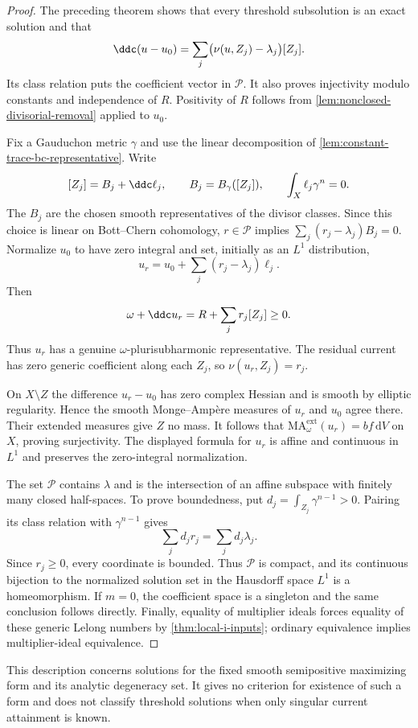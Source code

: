 \begin{proof}
The preceding theorem shows that every threshold subsolution is an exact solution and that
\[
 \ddc(u-u_0)=\sum_j\bigl(\nu(u,Z_j)-\lambda_j\bigr)[Z_j].
\]
Its class relation puts the coefficient vector in $\mathcal P$. It also proves injectivity modulo constants and independence of $R$. Positivity of $R$ follows from \cref{lem:nonclosed-divisorial-removal} applied to $u_0$.

Fix a Gauduchon metric $\gamma$ and use the linear decomposition of \cref{lem:constant-trace-bc-representative}. Write
\[
 [Z_j]=B_j+\ddc\ell_j,\qquad
 B_j=B_\gamma([Z_j]),\qquad \int_X\ell_j\gamma^n=0.
\]
The $B_j$ are the chosen smooth representatives of the divisor classes. Since this choice is linear on Bott--Chern cohomology, $r\in\mathcal P$ implies $\sum_j(r_j-\lambda_j)B_j=0$. Normalize $u_0$ to have zero integral and set, initially as an $L^1$ distribution,
\[
 u_r=u_0+\sum_j(r_j-\lambda_j)\ell_j.
\]
Then
\[
 \omega+\ddc u_r=R+\sum_j r_j[Z_j]\geq0.
\]
Thus $u_r$ has a genuine $\omega$-plurisubharmonic representative. The residual current has zero generic coefficient along each $Z_j$, so $\nu(u_r,Z_j)=r_j$.

On $X\setminus Z$ the difference $u_r-u_0$ has zero complex Hessian and is smooth by elliptic regularity. Hence the smooth Monge--Amp\`ere measures of $u_r$ and $u_0$ agree there. Their extended measures give $Z$ no mass. It follows that $\mathrm{MA}^{\mathrm{ext}}_\omega(u_r)=bf\,\mathrm{d}V$ on $X$, proving surjectivity. The displayed formula for $u_r$ is affine and continuous in $L^1$ and preserves the zero-integral normalization.

The set $\mathcal P$ contains $\lambda$ and is the intersection of an affine subspace with finitely many closed half-spaces. To prove boundedness, put $d_j=\int_{Z_j}\gamma^{n-1}>0$. Pairing its class relation with $\gamma^{n-1}$ gives
\[
 \sum_j d_jr_j=\sum_j d_j\lambda_j.
\]
Since $r_j\geq0$, every coordinate is bounded. Thus $\mathcal P$ is compact, and its continuous bijection to the normalized solution set in the Hausdorff space $L^1$ is a homeomorphism. If $m=0$, the coefficient space is a singleton and the same conclusion follows directly. Finally, equality of multiplier ideals forces equality of these generic Lelong numbers by \cref{thm:local-i-inputs}; ordinary equivalence implies multiplier-ideal equivalence.
\end{proof}

This description concerns solutions for the fixed smooth semipositive maximizing form and its analytic degeneracy set. It gives no criterion for existence of such a form and does not classify threshold solutions when only singular current attainment is known.

